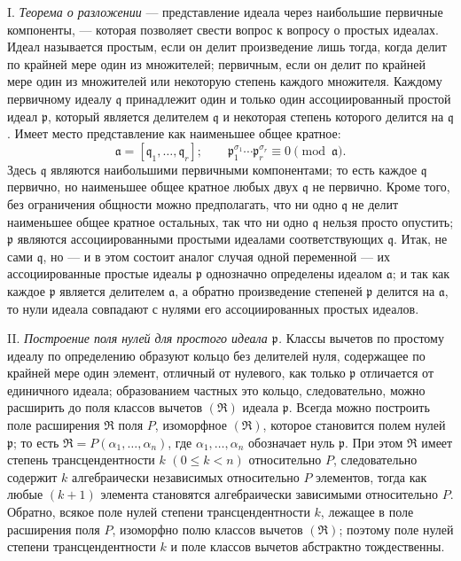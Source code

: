 \documentclass[11pt]{article}
\providecommand{\fraka}{\mathfrak a}
\providecommand{\frakp}{\mathfrak p}
\providecommand{\frakq}{\mathfrak q}
\providecommand{\frakR}{\mathfrak R}
\begin{document}
\noindent I. \emph{Теорема о разложении} --- представление идеала через наибольшие первичные компоненты, --- которая позволяет свести вопрос к вопросу о простых идеалах. Идеал называется простым, если он делит произведение лишь тогда, когда делит по крайней мере один из множителей; первичным, если он делит по крайней мере один из множителей или некоторую степень каждого множителя. Каждому первичному идеалу $\frakq$ принадлежит один и только один ассоциированный простой идеал $\frakp$, который является делителем $\frakq$ и некоторая степень которого делится на $\frakq$. Имеет место представление как наименьшее общее кратное:
\[
 \fraka=[\frakq_1,\ldots,\frakq_r];\qquad
 \frakp_1^{\sigma_1}\cdots \frakp_r^{\sigma_r}\equiv 0\pmod{\fraka}.
\]
Здесь $\frakq$ являются наибольшими первичными компонентами; то есть каждое $\frakq$ первично, но наименьшее общее кратное любых двух $\frakq$ не первично. Кроме того, без ограничения общности можно предполагать, что ни одно $\frakq$ не делит наименьшее общее кратное остальных, так что ни одно $\frakq$ нельзя просто опустить; $\frakp$ являются ассоциированными простыми идеалами соответствующих $\frakq$. Итак, не сами $\frakq$, но --- и в этом состоит аналог случая одной переменной --- их ассоциированные простые идеалы $\frakp$ однозначно определены идеалом $\fraka$; и так как каждое $\frakp$ является делителем $\fraka$, а обратно произведение степеней $\frakp$ делится на $\fraka$, то нули идеала совпадают с нулями его ассоциированных простых идеалов.

\noindent II. \emph{Построение поля нулей для простого идеала $\frakp$.} Классы вычетов по простому идеалу по определению образуют кольцо без делителей нуля, содержащее по крайней мере один элемент, отличный от нулевого, как только $\frakp$ отличается от единичного идеала; образованием частных это кольцо, следовательно, можно расширить до поля классов вычетов $(\frakR)$ идеала $\frakp$. Всегда можно построить поле расширения $\frakR$ поля $P$, изоморфное $(\frakR)$, которое становится полем нулей $\frakp$; то есть $\frakR=P(\alpha_1,\ldots,\alpha_n)$, где $\alpha_1,\ldots,\alpha_n$ обозначает нуль $\frakp$. При этом $\frakR$ имеет степень трансцендентности $k$ $(0\leq k<n)$ относительно $P$, следовательно содержит $k$ алгебраически независимых относительно $P$ элементов, тогда как любые $(k+1)$ элемента становятся алгебраически зависимыми относительно $P$. Обратно, всякое поле нулей степени трансцендентности $k$, лежащее в поле расширения поля $P$, изоморфно полю классов вычетов $(\frakR)$; поэтому поле нулей степени трансцендентности $k$ и поле классов вычетов абстрактно тождественны.
\end{document}
